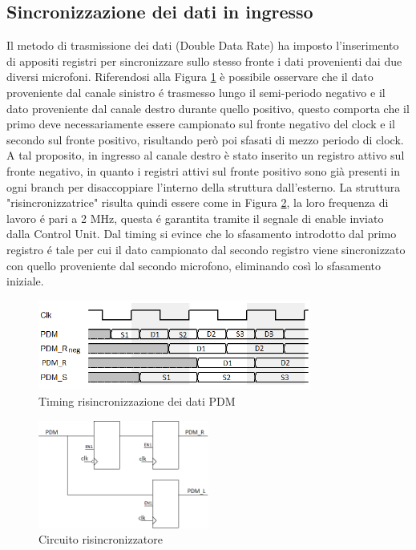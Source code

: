 \documentclass[a4paper, titlepage]{article}
\begin{document}
\subsection{Sincronizzazione dei dati in ingresso}
Il metodo di trasmissione dei dati (Double Data Rate) ha imposto l'inserimento di appositi registri per sincronizzare sullo stesso fronte i dati provenienti dai due diversi microfoni. Riferendosi alla Figura \ref{fig:timing_ddr} è possibile osservare che il dato proveniente dal canale sinistro é trasmesso lungo il semi-periodo negativo e il dato proveniente dal canale destro durante quello positivo, questo comporta che il primo deve necessariamente essere campionato sul fronte negativo del clock e il secondo sul fronte positivo, risultando però poi sfasati di mezzo periodo di clock.
\newline
A tal proposito, in ingresso al canale destro è stato inserito un registro attivo sul fronte negativo, in quanto i registri attivi sul fronte positivo sono già presenti in ogni branch per disaccoppiare l'interno della struttura dall'esterno. La struttura "risincronizzatrice" risulta quindi essere come in Figura  \ref{fig:resinc_schematic}, la loro frequenza di lavoro é pari a 
2 MHz, questa é garantita tramite il segnale di enable inviato dalla Control Unit.
\newline
Dal timing si evince che lo sfasamento introdotto dal primo registro é tale per cui il dato campionato dal secondo registro viene sincronizzato con quello proveniente dal secondo microfono, eliminando così lo sfasamento iniziale.

\begin{figure}[H]
    \centering
    \includegraphics[width=0.8\textwidth]{sincronizzazione_pdm.png}
    \caption{Timing risincronizzazione dei dati PDM}
    \label{fig:timing_ddr}
\end{figure}


\begin{figure}[H]
    \centering
    \includegraphics[width=0.5\textwidth]{resinc.png}
    \caption{Circuito risincronizzatore}
    \label{fig:resinc_schematic}
\end{figure}
\end{document}
